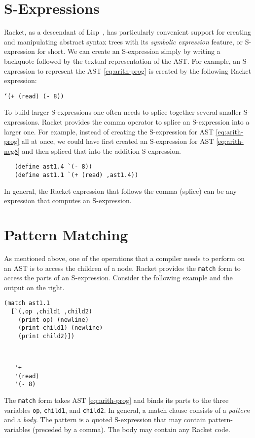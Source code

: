 \documentclass[12pt]{book}
\begin{document}
\section{S-Expressions}
\label{sec:s-expr}

Racket, as a descendant of Lisp~\citep{McCarthy:1960dz}, has
particularly convenient support for creating and manipulating abstract
syntax trees with its \emph{symbolic expression} feature, or
S-expression for short. We can create an S-expression simply by
writing a backquote followed by the textual representation of the
AST. For example, an S-expression to represent the AST
\eqref{eq:arith-prog} is created by the following Racket expression:
\begin{center}
\texttt{`(+ (read) (- 8))}
\end{center}

To build larger S-expressions one often needs to splice together
several smaller S-expressions. Racket provides the comma operator to
splice an S-expression into a larger one. For example, instead of
creating the S-expression for AST \eqref{eq:arith-prog} all at once,
we could have first created an S-expression for AST
\eqref{eq:arith-neg8} and then spliced that into the addition
S-expression.
\begin{lstlisting}
   (define ast1.4 `(- 8))
   (define ast1.1 `(+ (read) ,ast1.4))
\end{lstlisting}
In general, the Racket expression that follows the comma (splice)
can be any expression that computes an S-expression.

\section{Pattern Matching}
\label{sec:pattern-matching}

As mentioned above, one of the operations that a compiler needs to
perform on an AST is to access the children of a node.  Racket
provides the \texttt{match} form to access the parts of an
S-expression. Consider the following example and the output on the
right.
\begin{center}
\begin{minipage}{0.5\textwidth}
\begin{lstlisting}
(match ast1.1
  [`(,op ,child1 ,child2)
    (print op) (newline)
    (print child1) (newline)
    (print child2)])
\end{lstlisting}
\end{minipage}
\vrule
\begin{minipage}{0.25\textwidth}
\begin{lstlisting}


   '+
   '(read)
   '(- 8)
\end{lstlisting}
\end{minipage}
\end{center}
The \texttt{match} form takes AST \eqref{eq:arith-prog} and binds its
parts to the three variables \texttt{op}, \texttt{child1}, and
\texttt{child2}. In general, a match clause consists of a
\emph{pattern} and a \emph{body}. The pattern is a quoted S-expression
that may contain pattern-variables (preceded by a comma).  The body
may contain any Racket code.
\end{document}
